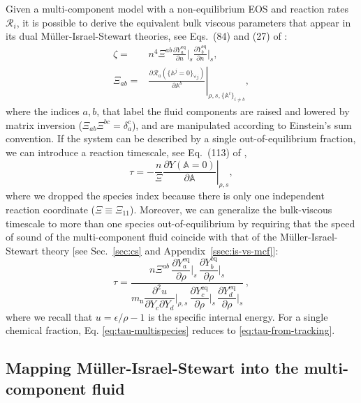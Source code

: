 \documentclass[aps,prd,twocolumn,a4paper,floatfix,nofootbib,superscriptaddress,nofootinbib]{revtex4}
\newcommand{\rn}{\mathrm{n}}
\newcommand{\req}{\mathrm{eq}}
\begin{document}
Given a multi-component model with a non-equilibrium EOS and reaction rates $\mathcal{R}_i$,
it is possible to derive the equivalent bulk viscous parameters that appear in its dual
M\"uller-Israel-Stewart theories, see Eqs.~(84) and (27) of \citet{Gavassino21bulk}:
%
\begin{align}
\label{eq:def-zeta}
\zeta={}&n^4\Xi^{ab}\frac{\partial Y_a^\req}{\partial n}\bigg|_s\frac{\partial Y_b^\req}{\partial n}\bigg|_s,\\
\label{eq:def-xi}
\Xi_{ab}={}&\left.\frac{\partial \mathcal R_a(\{\mathbb A^j=0\}_{\forall j})}{\partial \mathbb A^b}\right|_{\rho,s,\{\mathbb A^i\}_{i\neq b}},
\end{align}
%
where the indices $a,b$, that label the fluid components are raised and lowered by matrix inversion ($\Xi_{ab}\Xi^{bc}=\delta^c_a$), and are manipulated according to Einstein's sum convention.
If the system can be described by a single out-of-equilibrium fraction, we can
introduce a reaction timescale, see Eq.~(113) of \citet{Gavassino21bulk},
%
\begin{equation}
\label{eq:tau-from-tracking}
\tau=-\frac{n}{\Xi}\left.\frac{\partial Y(\mathbb A=0)}{\partial \mathbb A}\right|_{\rho,s},
\end{equation}
%
where we dropped the species index because there is only one independent reaction coordinate ($\Xi\equiv\Xi_{11}$).
%
Moreover, we can generalize the bulk-viscous timescale to more than one species
out-of-equilibrium by requiring that the speed of sound of the
multi-component fluid coincide with that of the M\"uller-Israel-Stewart
theory [see Sec.~\ref{sec:cs} and Appendix~\ref{ssec:is-vs-mcf}]:
%
\begin{equation}
\label{eq:tau-multispecies}
\tau = \dfrac{n \Xi^{ab} \,  \dfrac{\partial Y_a^\req}{\partial \rho} \bigg|_s
\,  \dfrac{\partial Y_b^\req}{\partial \rho} \bigg|_s}{ m_\rn \dfrac{\partial^2
u}{\partial Y_c \partial Y_d} \bigg|_{\rho,s} \,  \dfrac{\partial
Y_c^\req}{\partial \rho} \bigg|_s \, \dfrac{\partial Y_d^\req}{\partial \rho}
\bigg|_s} \, ,
\end{equation}
%
where we recall that $u=\epsilon/\rho-1$ is the specific internal energy.
For a single chemical fraction, Eq. \eqref{eq:tau-multispecies} reduces to \eqref{eq:tau-from-tracking}. 

\subsection{Mapping M\"uller-Israel-Stewart into the multi-component fluid}
\label{ssec:is2carter}
\end{document}
